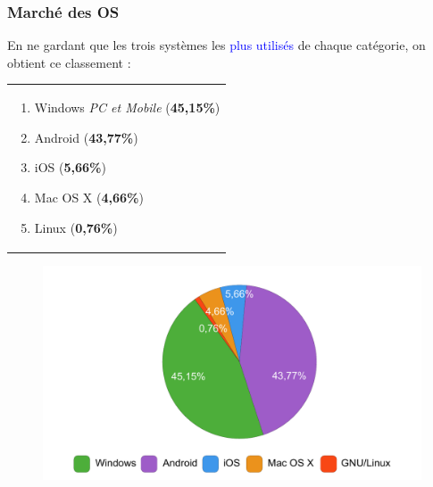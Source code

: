 \documentclass[aspectratio=169]{beamer}
\begin{document}
\begin{frame}
  \frametitle{Marché des OS}

  En ne gardant que les trois systèmes les \textcolor{blue}{plus utilisés} de
chaque catégorie, on obtient ce classement :

\begin{center}
	\begin{tabular} {p{7cm}}
    \centering
		\begin{enumerate}
    \item Windows \textit{PC et Mobile} (\textbf{45,15\%})
    \item Android (\textbf{43,77\%})
    \item iOS (\textbf{5,66\%})
    \item Mac OS X (\textbf{4,66\%})
    \item Linux (\textbf{0,76\%})
		\end{enumerate}
	\end{tabular}
\end{center}
\begin{figure}[!h]
  \vspace*{-1cm}
  \centering
  \includegraphics[scale=0.3]
  {textures/images/intro/moreUsedOS.pdf}
\end{figure}
\end{frame}
\end{document}
